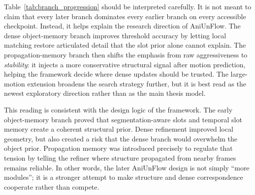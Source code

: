 \begin{table}[t]
\centering
\caption{\textbf{Representative validation summary across the main AniUnFlow development path.} The values are included as lightweight branch-level evidence rather than as the sole basis of the thesis. Lower EPE is better; higher threshold accuracy is better.}
\label{tab:branch_progression}
\end{table}

Table~\ref{tab:branch_progression} should be interpreted carefully. It is not meant to claim that every later branch dominates every earlier branch on every accessible checkpoint. Instead, it helps explain the research direction of AniUnFlow. The dense object-memory branch improves threshold accuracy by letting local matching restore articulated detail that the slot prior alone cannot explain. The propagation-memory branch then shifts the emphasis from raw aggressiveness to \emph{stability}: it injects a more conservative structural signal after motion prediction, helping the framework decide where dense updates should be trusted. The large-motion extension broadens the search strategy further, but it is best read as the newest exploratory direction rather than as the main thesis model.

This reading is consistent with the design logic of the framework. The early object-memory branch proved that segmentation-aware slots and temporal slot memory create a coherent structural prior. Dense refinement improved local geometry, but also created a risk that the dense branch would overwhelm the object prior. Propagation memory was introduced precisely to regulate that tension by telling the refiner where structure propagated from nearby frames remains reliable. In other words, the later AniUnFlow design is not simply ``more modules''; it is a stronger attempt to make structure and dense correspondence cooperate rather than compete.




